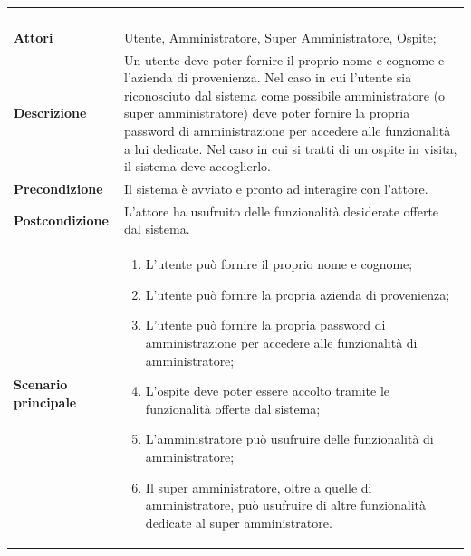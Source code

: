 \documentclass[AdR.tex]{subfiles}
\begin{document}
\begin{longtable}{l|p{10cm}}
\rowcolor[gray]{0.8} \multicolumn{2}{c}{} \\
\rowcolor[gray]{0.8} \multicolumn{2}{c}{\textbf{UC0 - Funzionalità sistema}} \\
\rowcolor[gray]{0.8} \multicolumn{2}{c}{} \\
\hline
&\\
\textbf{Attori} & Utente, Amministratore, Super Amministratore, Ospite;\\[7pt]
\textbf{Descrizione} & Un utente deve poter fornire il proprio nome e cognome e l'azienda di provenienza. Nel caso in cui l'utente sia riconosciuto dal sistema come possibile amministratore (o super amministratore) deve poter fornire la propria password di amministrazione per accedere alle funzionalità a lui dedicate. Nel caso in cui si tratti di un ospite in visita, il sistema deve accoglierlo.\\[7pt]
\textbf{Precondizione} & Il sistema è avviato e pronto ad interagire con l'attore.\\[7pt]
\textbf{Postcondizione} & L'attore ha usufruito delle funzionalità desiderate offerte dal sistema. \\[7pt]
\textbf{Scenario principale} &
\begin{enumerate}
 \item L'utente può fornire il proprio nome e cognome;
 \item L'utente può fornire la propria azienda di provenienza;
 \item L'utente può fornire la propria password di amministrazione per accedere alle funzionalità di amministratore;
 \item L'ospite deve poter essere accolto tramite le funzionalità offerte dal sistema;
 \item L'amministratore può usufruire delle funzionalità di amministratore;
 \item Il super amministratore, oltre a quelle di amministratore, può usufruire di altre funzionalità dedicate al super amministratore.
\end{enumerate}
\\[7pt]\hline
\end{longtable}
\end{document}
